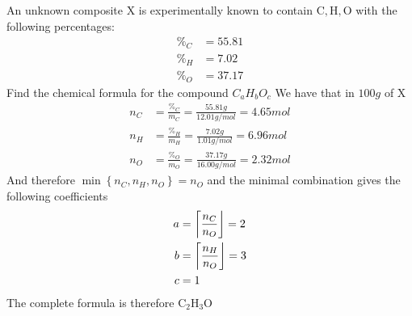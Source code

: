 \documentclass[../qm.tex]{subfiles}
\begin{document}
\begin{eg}
	An unknown composite $\mathrm{X}$ is experimentally known to contain $\mathrm{C,H,O}$ with the following percentages:
	\begin{equation*}
		\begin{aligned}
			\%_C&=55.81\\
			\%_H&=7.02\\
			\%_O&=37.17
		\end{aligned}
	\end{equation*}
	Find the chemical formula for the compound $C_aH_bO_c$
	We have that in $100\unit{g}$ of $\mathrm{X}$
	\begin{equation*}
		\begin{aligned}
			n_C&=\frac{\%_C}{m_C}=\frac{55.81\unit{g}}{12.01\unit{g/mol}}=4.65\unit{mol}\\
			n_H&=\frac{\%_H}{m_H}=\frac{7.02\unit{g}}{1.01\unit{g/mol}}=6.96\unit{mol}\\
			n_O&=\frac{\%_O}{m_O}=\frac{37.17\unit{g}}{16.00\unit{g/mol}}=2.32\unit{mol}
		\end{aligned}
	\end{equation*}
	And therefore $\min\left\{n_C,n_H,n_O\right\}=n_O$ and the minimal combination gives the following coefficients
	\begin{equation*}
		\begin{aligned}
			a&=\rounding*{\frac{n_C}{n_O}}=2\\
			b&=\rounding*{\frac{n_H}{n_O}}=3\\
			c&=1
		\end{aligned}
	\end{equation*}
	The complete formula is therefore $\mathrm{C_2H_3O}$
\end{eg}
\end{document}
